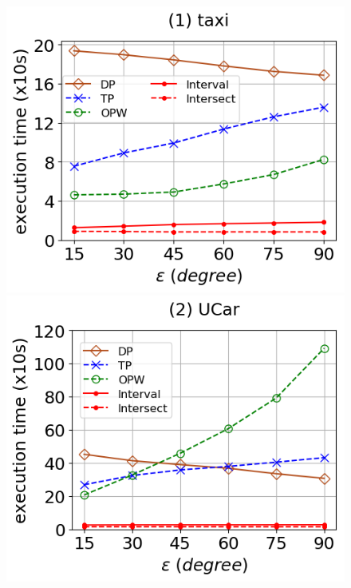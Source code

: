 \begin{figure}[tb!]
	\centering
	\includegraphics[scale=0.315]{Figures/Exp-DAD-time-epsilon-taxi.png}\hspace{1ex}
	\includegraphics[scale=0.315]{Figures/Exp-DAD-time-epsilon-service.png} 	\hspace{1ex}

\end{figure}
